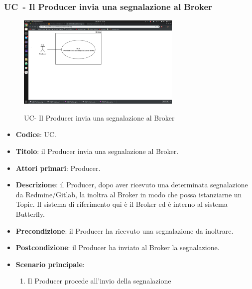 \subsubsection{UC\theuccount\ - Il Producer invia una segnalazione al Broker}
	\begin{figure}[H]
		\centering
		\includegraphics[width=0.7\textwidth]{img/UC2Producer.png}\\
		\caption{UC\theuccount - Il Producer invia una segnalazione al Broker}
	\end{figure}
	\begin{itemize}
		\item \textbf{Codice}: UC\theuccount.
		\item \textbf{Titolo}: il Producer invia una segnalazione al Broker.
		\item \textbf{Attori primari}: Producer.
		\item \textbf{Descrizione}: il Producer, dopo aver ricevuto una determinata segnalazione da Redmine/Gitlab, la inoltra al Broker in modo che possa istanziarne un Topic. Il sistema di riferimento qui è il Broker ed è interno al sistema Butterfly.
		\item \textbf{Precondizione}: il Producer ha ricevuto una segnalazione da inoltrare.
		\item \textbf{Postcondizione}: il Producer ha inviato al Broker la segnalazione.
		\item \textbf{Scenario principale}:
		\begin{enumerate}
			\item Il Producer procede all'invio della segnalazione
		\end{enumerate}
		 
	\end{itemize}


